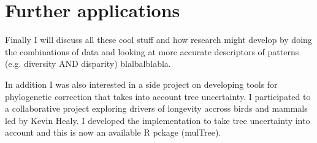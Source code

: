 \section{Further applications} %

Finally I will discuss all these cool stuff and how research might develop by doing the combinations of data and looking at more accurate descriptors of patterns (e.g. diversity AND disparity) blalbalblabla.

In addition I was also interested in a side project on developing tools for phylogenetic correction that takes into account tree uncertainty.
I participated to a collaborative project exploring drivers of longevity accross birds and mammals led by Kevin Healy.
I developed the implementation to take tree uncertainty into account and this is now an available R pckage (mulTree).

